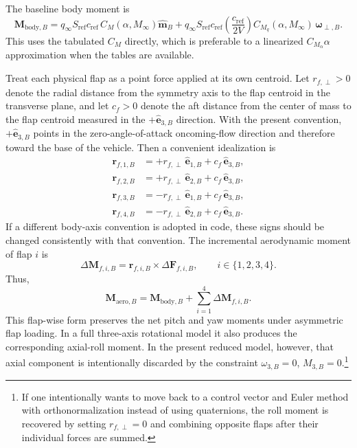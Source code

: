 The baseline body moment is
\begin{equation}
\mathbf M_{\mathrm{body},B}
=
q_\infty S_{\mathrm{ref}}c_{\mathrm{ref}}
\,C_M(\alpha,M_\infty)\hat{\mathbf m}_B
+
q_\infty S_{\mathrm{ref}}c_{\mathrm{ref}}
\left(\frac{c_{\mathrm{ref}}}{2V}\right)
C_{M_q}(\alpha,M_\infty)\,\boldsymbol\omega_{\perp,B}. \label{eq:step8_body_moment}
\end{equation}
This uses the tabulated \(C_M\) directly, which is preferable to a linearized \(C_{M_\alpha}\alpha\) approximation when the tables are available.

Treat each physical flap as a point force applied at its own centroid. Let \(r_{f,\perp}>0\) denote the radial distance from the symmetry axis to the flap centroid in the transverse plane, and let \(c_f>0\) denote the aft distance from the center of mass to the flap centroid measured in the \(+\hat{\mathbf e}_{3,B}\) direction. With the present convention, \(+\hat{\mathbf e}_{3,B}\) points in the zero-angle-of-attack oncoming-flow direction and therefore toward the base of the vehicle. Then a convenient idealization is
\begin{equation}
\begin{aligned}
\mathbf r_{f,1,B}
&=
+r_{f,\perp}\,\hat{\mathbf e}_{1,B}
+c_f\,\hat{\mathbf e}_{3,B}, \\
\mathbf r_{f,2,B}
&=
+r_{f,\perp}\,\hat{\mathbf e}_{2,B}
+c_f\,\hat{\mathbf e}_{3,B}, \\
\mathbf r_{f,3,B}
&=
-r_{f,\perp}\,\hat{\mathbf e}_{1,B}
+c_f\,\hat{\mathbf e}_{3,B}, \\
\mathbf r_{f,4,B}
&=
-r_{f,\perp}\,\hat{\mathbf e}_{2,B}
+c_f\,\hat{\mathbf e}_{3,B}.
\end{aligned} \label{eq:flap_centroids}
\end{equation}
If a different body-axis convention is adopted in code, these signs should be changed consistently with that convention.
The incremental aerodynamic moment of flap \(i\) is
\begin{equation}
\Delta\mathbf M_{f,i,B}
=
\mathbf r_{f,i,B}\times \Delta\mathbf F_{f,i,B},
\qquad
i\in\{1,2,3,4\}. \label{eq:flap_moment}
\end{equation}
Thus,
\begin{equation}
\mathbf M_{\mathrm{aero},B}
=
\mathbf M_{\mathrm{body},B}
+
\sum_{i=1}^4 \Delta\mathbf M_{f,i,B}. \label{eq:total_aero_moment}
\end{equation}
This flap-wise form preserves the net pitch and yaw moments under asymmetric flap loading. In a full three-axis rotational model it also produces the corresponding axial-roll moment. In the present reduced model, however, that axial component is intentionally discarded by the constraint \(\omega_{3,B}=0\), \(M_{3,B}=0\).\footnote{If one intentionally wants to move back to a control vector and Euler method with orthonormalization instead of using quaternions, the roll moment is recovered by setting \(r_{f,\perp}=0\) and combining opposite flaps after their individual forces are summed.}

